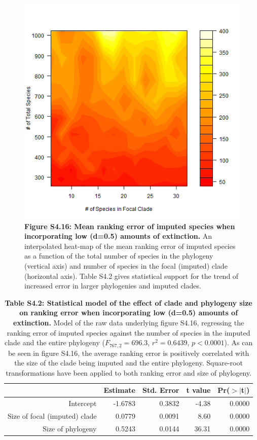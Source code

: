 \documentclass[10pt,english]{article}
\begin{document}
\begin{figure}[!ht]
  \center
  \includegraphics[width=.5\textwidth]{../figures/rankingErrorLowExtinction.png}
  \caption*{\textbf{Figure S4.16: Mean ranking error of imputed species when
  incorporating low (d=0.5) amounts of extinction.} An interpolated heat-map of
  the mean ranking error of imputed species as a function of the total number of
  species in the phylogeny (vertical axis) and number of species in the focal
  (imputed) clade (horizontal axis). Table S4.2 gives statistical support for
  the trend of increased error in larger phylogenies and imputed clades.}
\end{figure}

\begin{table}[ht]
  \centering
  \begin{tabular}{rrrrr}
    \hline
   & Estimate & Std. Error & t value & Pr($>$$|$t$|$) \\ \hline
   Intercept & -1.6783 & 0.3832 & -4.38 & 0.0000 \\
   Size of focal (imputed) clade & 0.0779 & 0.0091 & 8.60 & 0.0000 \\
   Size of phylogeny & 0.5243 & 0.0144 & 36.31 & 0.0000 \\ \hline
  \end{tabular}
  \caption*{\textbf{Table S4.2: Statistical model of the effect of clade and
      phylogeny size on ranking error when incorporating low (d=0.5) amounts of
      extinction.} Model of the raw data underlying figure S4.16, regressing the
      ranking error of imputed species against the number of species in the
      imputed clade and the entire phylogeny ($F_{767,2} = 696.3$, $r^2 =
      0.6439$, $p < 0.0001$). As can be seen in figure S4.16, the average
      ranking error is positively correlated with the size of the clade being
      imputed and the entire phylogeny. Square-root transformations have been
      applied to both ranking error and size of phylogeny.}
\end{table}
\end{document}
